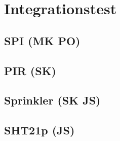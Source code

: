 
\chapter{Integrationstest}

\section{SPI (MK PO)}


\section{PIR (SK)}


\section{Sprinkler (SK JS)}


\section{SHT21p (JS)}
